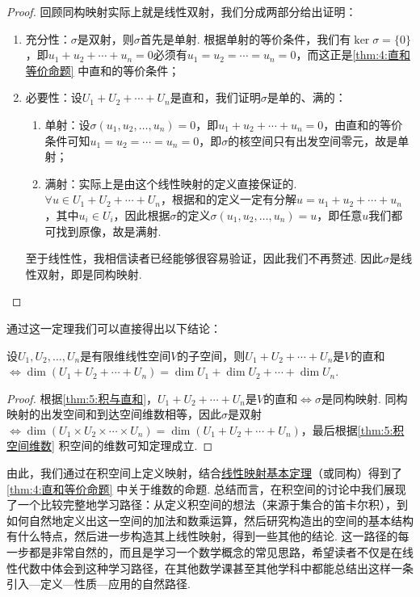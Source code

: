 \begin{proof}
    回顾同构映射实际上就是线性双射，我们分成两部分给出证明：
    \begin{enumerate}
        \item 充分性：$\sigma$是双射，则$\sigma$首先是单射. 根据单射的等价条件，我们有$\ker \sigma=\{0\}$，即$u_1+u_2+\cdots+u_n=0$必须有$u_1=u_2=\cdots=u_n=0$，而这正是\autoref{thm:4:直和等价命题} 中直和的等价条件；

        \item 必要性：设$U_1+U_2+\cdots+U_n$是直和，我们证明$\sigma$是单的、满的：
              \begin{enumerate}
                  \item 单射：设$\sigma(u_1,u_2,\ldots,u_n)=0$，即$u_1+u_2+\cdots+u_n=0$，由直和的等价条件可知$u_1=u_2=\cdots=u_n=0$，即$\sigma$的核空间只有出发空间零元，故是单射；

                  \item 满射：实际上是由这个线性映射的定义直接保证的. $\forall u \in U_1+U_2+\cdots+U_n$，根据和的定义一定有分解$u=u_1+u_2+\cdots+u_n$，其中$u_i \in U_i$，因此根据$\sigma$的定义$\sigma(u_1,u_2,\ldots,u_n)=u$，即任意$u$我们都可找到原像，故是满射.
              \end{enumerate}
        至于线性性，我相信读者已经能够很容易验证，因此我们不再赘述. 因此$\sigma$是线性双射，即是同构映射.
    \end{enumerate}
\end{proof}

通过这一定理我们可以直接得出以下结论：
\begin{theorem}
    设$U_1,U_2,\ldots,U_n$是有限维线性空间$V$的子空间，则$U_1+U_2+\cdots+U_n$是$V$的直和$\iff \dim(U_1+U_2+\cdots+U_n)=\dim U_1+\dim U_2+\cdots+\dim U_n$.
\end{theorem}

\begin{proof}
    根据\autoref{thm:5:积与直和}，$U_1+U_2+\cdots+U_n$是$V$的直和$\iff \sigma$是同构映射. 同构映射的出发空间和到达空间维数相等，因此$\sigma$是双射$\iff \dim(U_1 \times U_2 \times \cdots \times U_n)=\dim(U_1+U_2+\cdots+U_n)$，最后根据\autoref{thm:5:积空间维数} 积空间的维数可知定理成立.
\end{proof}

由此，我们通过在积空间上定义映射，结合\hyperref[thm:6:线性映射基本定理]{线性映射基本定理}（或同构）得到了\autoref{thm:4:直和等价命题} 中关于维数的命题. 总结而言，在积空间的讨论中我们展现了一个比较完整地学习路径：从定义积空间的想法（来源于集合的笛卡尔积），到如何自然地定义出这一空间的加法和数乘运算，然后研究构造出的空间的基本结构有什么特点，然后进一步构造其上线性映射，得到一些其他的结论. 这一路径的每一步都是非常自然的，而且是学习一个数学概念的常见思路，希望读者不仅是在线性代数中体会到这种学习路径，在其他数学课甚至其他学科中都能总结出这样一条引入—定义—性质—应用的自然路径.

